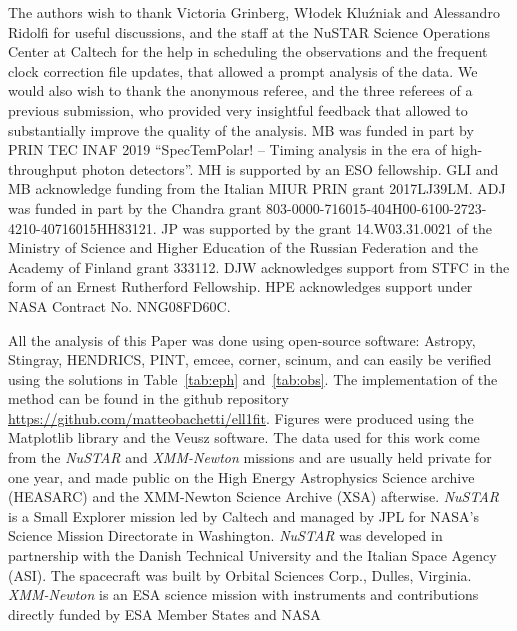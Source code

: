 \documentclass[twocolumn]{aastex631}
\newcommand{\xmm}{{\it XMM-Newton}\xspace}
\newcommand{\nustar}{\textit{NuSTAR}\xspace}
\begin{document}
\begin{acknowledgments}

The authors wish to thank Victoria Grinberg, W{\l}odek Klu\'zniak and Alessandro Ridolfi for useful discussions, and the staff at the NuSTAR Science Operations Center at Caltech for the help in scheduling the observations and the frequent clock correction file updates, that allowed a prompt analysis of the data.
We would also wish to thank the anonymous referee, and the three referees of a previous submission, who provided very insightful feedback that allowed to substantially improve the quality of the analysis.
MB was funded in part by PRIN TEC
INAF 2019 ``SpecTemPolar! -- Timing analysis in the era of high-throughput photon detectors''.
MH is supported by an ESO fellowship.
GLI and MB  acknowledge  funding  from  the  Italian MIUR PRIN grant 2017LJ39LM.
ADJ was funded in part by the Chandra grant 803-0000-716015-404H00-6100-2723-4210-40716015HH83121.
JP was supported by the grant 14.W03.31.0021 of the Ministry of Science and Higher Education of the Russian Federation and the Academy of Finland grant 333112.
DJW acknowledges support from STFC in the form of an Ernest Rutherford Fellowship.
HPE acknowledges support under NASA Contract No. NNG08FD60C.

All the analysis of this Paper was done using open-source software: Astropy, Stingray, HENDRICS, PINT, emcee, corner, scinum, and can easily be verified  using the solutions in Table~\ref{tab:eph} and~\ref{tab:obs}.
The implementation of the \citet{pletschGammaRayTimingRedback2015} method can be found in the github repository \url{https://github.com/matteobachetti/ell1fit}.
Figures were produced using the Matplotlib library and the Veusz software.
The data used for this work come from the \nustar and \xmm missions and are usually held private for one year, and made public on the High Energy Astrophysics Science archive (HEASARC) and the XMM-Newton Science Archive (XSA) afterwise. \nustar is a Small Explorer mission led by Caltech and managed by JPL for NASA's Science Mission Directorate in Washington. \nustar was developed in partnership with the Danish Technical University and the Italian Space Agency (ASI). The spacecraft was built by Orbital Sciences Corp., Dulles, Virginia. 
\xmm is an ESA science mission with instruments and contributions directly funded by ESA Member States and NASA

\end{acknowledgments}
\end{document}

